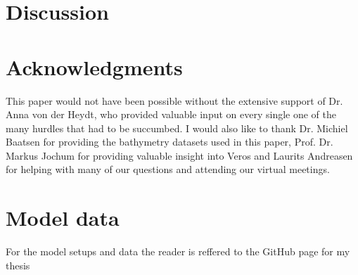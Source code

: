 \documentclass[a4paper]{article}
\begin{document}
\begin{multicols}{2}



\section{Discussion}

\section{Acknowledgments}
This paper would not have been possible without the extensive support of Dr. Anna von der Heydt, who provided valuable input on every single one of the many hurdles that had to be succumbed. I would also like to thank Dr. Michiel Baatsen for providing the bathymetry datasets used in this paper, Prof. Dr. Markus Jochum for providing valuable insight into Veros and Laurits Andreasen for helping with many of our questions and attending our virtual meetings.
\section{Model data}

For the model setups and data the reader is reffered to the GitHub page for my thesis

%

\printbibliography


\end{multicols}
\appendix
\end{document}
